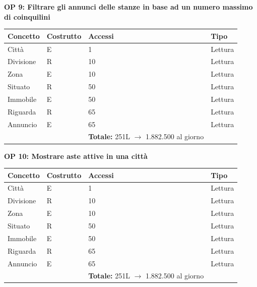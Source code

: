 \documentclass[a4paper,12pt]{report}
\begin{document}
            \textbf{OP 9: Filtrare gli annunci delle stanze in base ad un numero massimo di coinquilini}
        	\begin{table}[H]
            \centering
             \begin{tabular}{llll}
             \rowcolor{yellow!20} \textbf{Concetto} & \textbf{Costrutto} & \textbf{Accessi} & \textbf{Tipo}\\ [0.5ex] 
             \hline
             Città & E & 1 & Lettura \\ 
             Divisione & R & 10 & Lettura \\ 
             Zona & E & 10 & Lettura \\ 
             Situato & R & 50 & Lettura \\ 
             Immobile & E & 50 & Lettura \\ 
             Riguarda & R & 65 & Lettura \\ 
             Annuncio & E & 65 & Lettura \\ 
             \hline
                \rowcolor{yellow!20} &   & \textbf{Totale:} 251L $\rightarrow$ 1.882.500 al giorno &  \\ [1ex] 
             
             \end{tabular}
            \end{table}

            \textbf{OP 10: Mostrare aste attive in una città}
        	\begin{table}[H]
            \centering
             \begin{tabular}{llll}
             \rowcolor{yellow!20} \textbf{Concetto} & \textbf{Costrutto} & \textbf{Accessi} & \textbf{Tipo}\\ [0.5ex] 
             \hline
             Città & E & 1 & Lettura \\ 
             Divisione & R & 10 & Lettura \\ 
             Zona & E & 10 & Lettura \\ 
             Situato & R & 50 & Lettura \\ 
             Immobile & E & 50 & Lettura \\ 
             Riguarda & R & 65 & Lettura \\ 
             Annuncio & E & 65 & Lettura \\ 
             \hline
                \rowcolor{yellow!20} &   & \textbf{Totale:} 251L $\rightarrow$ 1.882.500 al giorno &  \\ [1ex] 
             
             \end{tabular}
            \end{table}
\end{document}
